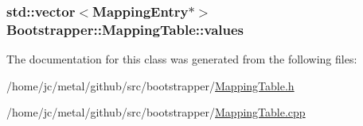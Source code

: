 \subsubsection[{values}]{\setlength{\rightskip}{0pt plus 5cm}std\+::vector$<${\bf Mapping\+Entry}$\ast$$>$ Bootstrapper\+::\+Mapping\+Table\+::values}\label{classBootstrapper_1_1MappingTable_ad60b5c92cc19d1d31ed8012c22946fee}


The documentation for this class was generated from the following files\+:\begin{DoxyCompactItemize}
\item 
/home/jc/metal/github/src/bootstrapper/\hyperlink{MappingTable_8h}{Mapping\+Table.\+h}\item 
/home/jc/metal/github/src/bootstrapper/\hyperlink{MappingTable_8cpp}{Mapping\+Table.\+cpp}\end{DoxyCompactItemize}
